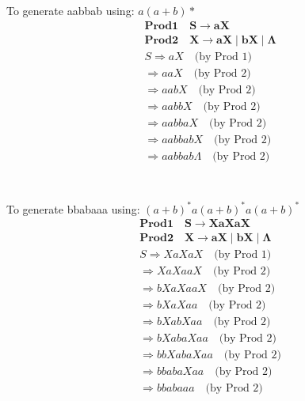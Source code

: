 \documentclass[12pt,a4paper,oneside]{report}
\begin{document}
\section{}
To generate aabbab using: $a(a +b)*$
\begin{equation}
\begin{split}
&\mathbf {Prod 1 \quad S \to aX}\\
&\mathbf{Prod 2 \quad X \to aX \mid bX \mid \Lambda}\\
&S \Longrightarrow aX \quad \text{(by Prod 1)}\\
&\Longrightarrow aaX \quad \text{(by Prod 2)}\\
&\Longrightarrow aabX \quad \text{(by Prod 2)}\\
&\Longrightarrow aabbX \quad \text{(by Prod 2)}\\
&\Longrightarrow aabbaX \quad \text{(by Prod 2)}\\
&\Longrightarrow aabbabX \quad \text{(by Prod 2)}\\
&\Longrightarrow aabbab\Lambda \quad \text{(by Prod 2)}\\
\end{split}
\end{equation}
\section{}
To generate bbabaaa using: $(a + b)^*a(a + b)^*a(a + b)^*$
\begin{equation}
\begin{split}
&\mathbf {Prod 1 \quad S \to XaXaX}\\
&\mathbf {Prod 2 \quad X \to aX \mid bX \mid \Lambda}\\
&S \Longrightarrow XaXaX \quad \text{(by Prod 1)}\\
&\Longrightarrow XaXaaX \quad \text{(by Prod 2)}\\
&\Longrightarrow bXaXaaX \quad \text{(by Prod 2)}\\
&\Longrightarrow bXaXaa \quad \text{(by Prod 2)}\\
&\Longrightarrow bXabXaa \quad \text{(by Prod 2)}\\
&\Longrightarrow bXabaXaa \quad \text{(by Prod 2)}\\
&\Longrightarrow bbXabaXaa \quad \text{(by Prod 2)}\\
&\Longrightarrow bbabaXaa \quad \text{(by Prod 2)}\\
&\Longrightarrow bbabaaa \quad \text{(by Prod 2)}\\
\end{split}
\end{equation}
\end{document}
